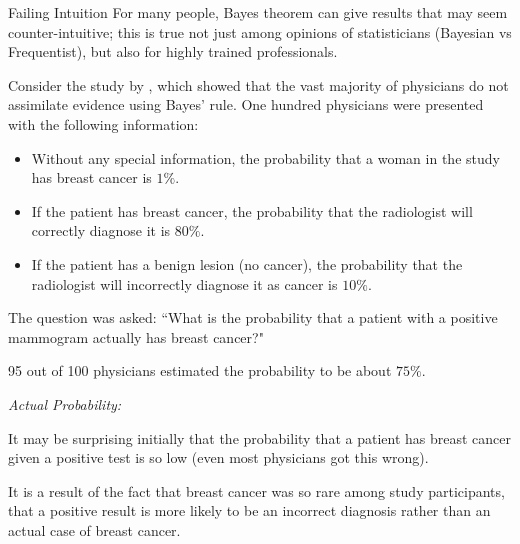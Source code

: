  \begin{frame}[allowframebreaks]{Failing Intuition}
    For many people, Bayes theorem can give results that may seem counter-intuitive; this is true not just among opinions of statisticians (Bayesian vs Frequentist), but also for highly trained professionals. 
    
    Consider the study by \citet{eddy82}, which showed that the vast majority of physicians do not assimilate evidence using Bayes' rule.
    One hundred physicians were presented with the following information: 
    
    \framebreak
    
    \begin{itemize}
      \item Without any special information, the probability that a woman in the study has breast cancer is $1\%$.
      \item If the patient has breast cancer, the probability that the radiologist will correctly diagnose it is $80\%$.
      \item If the patient has a benign lesion (no cancer), the probability that the radiologist will incorrectly diagnose it as cancer is $10\%$.
      \end{itemize}
      
      The question was asked: ``What is the probability that a patient with a positive mammogram actually has breast cancer?"
      
      95 out of 100 physicians estimated the probability to be about $75\%$.
      
      \framebreak
      
      \emph{Actual Probability:}
      
      
      \framebreak
      
      It may be surprising initially that the probability that a patient has breast cancer given a positive test is so low (even most physicians got this wrong).
      
      It is a result of the fact that breast cancer was so rare among study participants, that a positive result is more likely to be an incorrect diagnosis rather than an actual case of breast cancer.
      
    
  \end{frame}
  
